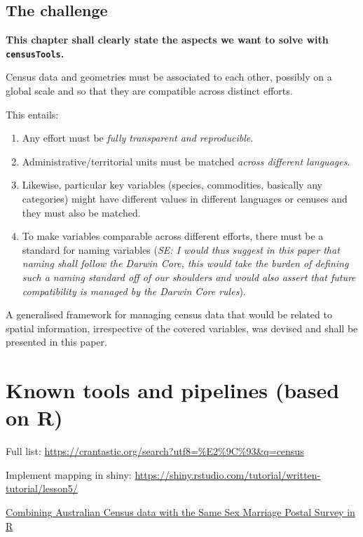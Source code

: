 \documentclass[12pt,]{article}
\providecommand{\tightlist}{%
  \setlength{\itemsep}{0pt}\setlength{\parskip}{0pt}}
\begin{document}
\hypertarget{the-challenge}{%
\subsection{The challenge}\label{the-challenge}}

\textbf{This chapter shall clearly state the aspects we want to solve with \texttt{censusTools}.}

Census data and geometries must be associated to each other, possibly on a global scale and so that they are compatible across distinct efforts.

This entails:

\begin{enumerate}
\def\labelenumi{\arabic{enumi}.}
\tightlist
\item
  Any effort must be \emph{fully transparent and reproducible}.
\item
  Administrative/territorial units must be matched \emph{across different languages}.
\item
  Likewise, particular key variables (species, commodities, basically any categories) might have different values in different languages or cenuses and they must also be matched.
\item
  To make variables comparable across different efforts, there must be a standard for naming variables (\emph{SE: I would thus suggest in this paper that naming shall follow the Darwin Core, this would take the burden of defining such a naming standard off of our shoulders and would also assert that future compatibility is managed by the Darwin Core rules}).
\end{enumerate}

A generalised framework for managing census data that would be related to spatial information, irrespective of the covered variables, was devised and shall be presented in this paper.

\hypertarget{known-tools-and-pipelines-based-on-r}{%
\section{Known tools and pipelines (based on R)}\label{known-tools-and-pipelines-based-on-r}}

Full list: \url{https://crantastic.org/search?utf8=\%E2\%9C\%93\&q=census}

Implement mapping in shiny: \url{https://shiny.rstudio.com/tutorial/written-tutorial/lesson5/}

\href{https://medium.com/@miles.mcbain/combining-australian-census-data-with-the-same-sex-marriage-postal-survey-in-r-39d9b2082249}{Combining Australian Census data with the Same Sex Marriage Postal Survey in R}
\end{document}
